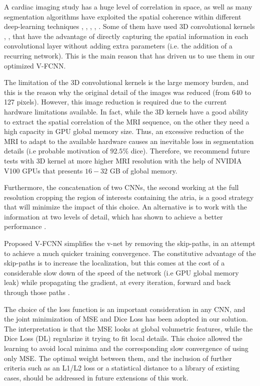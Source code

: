 \documentclass{llncs}
\begin{document}
A cardiac imaging study has a huge level of correlation in space, as well as many segmentation algorithms have exploited the spatial coherence within different deep-learning techniques \cite{Fausto}, \cite{Isensee}, \cite{Hinrich}, \cite{Poudel}, \cite{Jianxu}. Some of them have used 3D convolutional kernels \cite{Fausto}, \cite{Isensee}, \cite{Hinrich} that have the advantage of directly capturing the spatial information in each convolutional layer without adding extra parameters (i.e. the addition of a recurring network). This is the main reason that has driven us to use them in our optimized V-FCNN.

The limitation of the 3D convolutional kernels is the large memory burden, and this is the reason why the original detail of the images was reduced (from 640 to 127 pixels).
However, this image reduction is required due to the current hardware limitations available. In fact, while the 3D kernels have a good ability to extract the spatial correlation of the MRI sequence, on the other they need a high capacity in GPU global memory size.
Thus, an excessive reduction of the MRI to adapt to the available hardware causes an inevitable
loss in segmentation details (i.e probable motivation of $92.5 \%$ dice).
Therefore, we recommend future tests with 3D kernel at more higher MRI resolution with the help
of NVIDIA V100 GPUs \cite{ZheJia} that presents $16-32$ GB of global memory.

Furthermore, the concatenation of two CNNs, the second working at the full resolution cropping the region of interests containing the atria, is a good strategy that will minimize the impact of this choice. An alternative is to work with the information at two levels of detail, which has shown to achieve a better performance \cite{Zhaohan}.

Proposed V-FCNN simplifies the v-net \cite{Fausto} by removing the skip-paths, in an attempt to achieve a much quicker training convergence. The constitutive advantage of the skip-paths is to increase the localization, but this comes at the cost of a considerable slow down of the speed of the network (i.e GPU global memory leak) while propagating the gradient, at every iteration, forward and back through those paths \cite{AdamPaszke}.

The choice of the loss function is an important consideration in any CNN, and the joint minimization of MSE and Dice Loss has been adopted in our solution. The interpretation is that the MSE looks at global volumetric features, while the Dice Loss (DL) regularize it trying to fit local details. This choice allowed the learning to avoid local minima and the corresponding slow convergence of using only MSE. The optimal weight between them, and the inclusion of further criteria such as an L1/L2 loss or a statistical distance to a library of existing cases, should be addressed in future extensions of this work.
\end{document}
